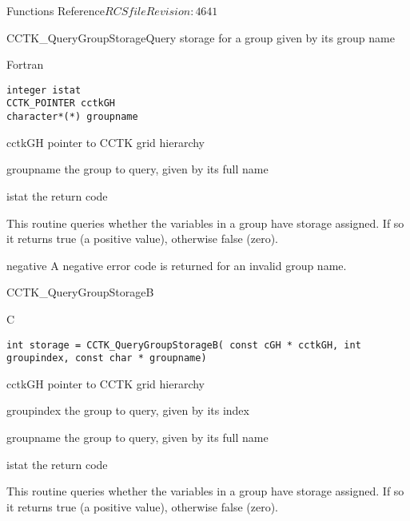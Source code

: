 \begin{cactuspart}{ Functions Reference}{$RCSfile$}{$Revision: 4641 $}
\begin{FunctionDescription}{CCTK\_QueryGroupStorage}{Query storage for a group given by its group name}
\begin{SynopsisSection}
\begin{Synopsis}{Fortran}
\begin{verbatim}
integer istat
CCTK_POINTER cctkGH
character*(*) groupname\end{verbatim}
\end{Synopsis}
\end{SynopsisSection}
\begin{ParameterSection}
\begin{Parameter}{cctkGH}
pointer to CCTK grid hierarchy
\end{Parameter}
\begin{Parameter}{groupname}
the group to query, given by its full name
\end{Parameter}
\begin{Parameter}{istat}
the return code
\end{Parameter}
\end{ParameterSection}
\begin{Discussion}
This routine queries whether the variables in a group have storage assigned.
If so it returns true (a positive value), otherwise false (zero).
\end{Discussion}
\begin{ErrorSection}
\begin{Error}{negative}
A negative error code is returned for an invalid group name.
\end{Error}
\end{ErrorSection}
\end{FunctionDescription}


\begin{FunctionDescription}{CCTK\_QueryGroupStorageB}{}
\label{CCTK-QueryGroupStorageB}
\begin{SynopsisSection}
\begin{Synopsis}{C}
\begin{verbatim}int storage = CCTK_QueryGroupStorageB( const cGH * cctkGH, int groupindex, const char * groupname)\end{verbatim}
\end{Synopsis}
\end{SynopsisSection}
\begin{ParameterSection}
\begin{Parameter}{cctkGH}
pointer to CCTK grid hierarchy
\end{Parameter}
\begin{Parameter}{groupindex}
the group to query, given by its index
\end{Parameter}
\begin{Parameter}{groupname}
the group to query, given by its full name
\end{Parameter}
\begin{Parameter}{istat}
the return code
\end{Parameter}
\end{ParameterSection}
\begin{Discussion}
This routine queries whether the variables in a group have storage assigned.
If so it returns true (a positive value), otherwise false (zero).


\end{Discussion}
\end{FunctionDescription}
\end{cactuspart}
